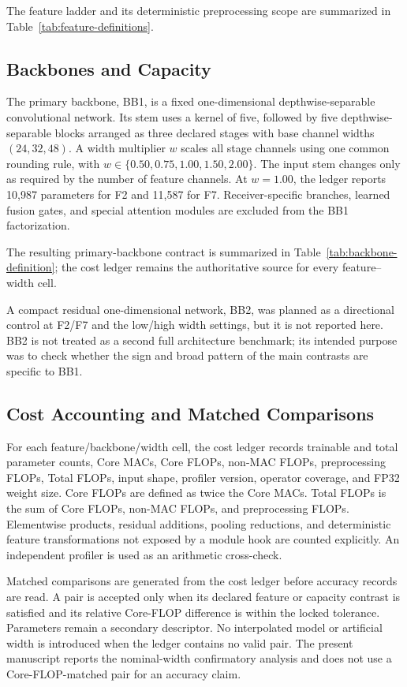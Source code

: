 The feature ladder and its deterministic preprocessing scope are summarized in
Table~\ref{tab:feature-definitions}.


\subsection{Backbones and Capacity}
The primary backbone, BB1, is a fixed one-dimensional depthwise-separable
convolutional network. Its stem uses a kernel of five, followed by five
depthwise-separable blocks arranged as three declared stages with base channel
widths $(24,32,48)$. A width multiplier $w$ scales all stage channels using one
common rounding rule, with $w\in\{0.50,0.75,1.00,1.50,2.00\}$. The input stem
changes only as required by the number of feature channels. At $w=1.00$, the
ledger reports 10,987 parameters for F2 and 11,587 for F7. Receiver-specific
branches, learned fusion gates, and special attention modules are excluded
from the BB1 factorization.

The resulting primary-backbone contract is summarized in
Table~\ref{tab:backbone-definition}; the cost ledger remains the authoritative
source for every feature--width cell.


A compact residual one-dimensional network, BB2, was planned as a directional
control at F2/F7 and the low/high width settings, but it is not reported here.
BB2 is not treated as a second full architecture benchmark; its intended
purpose was to check whether the sign and broad pattern of the main contrasts
are specific to BB1.

\subsection{Cost Accounting and Matched Comparisons}
For each feature/backbone/width cell, the cost ledger records trainable and
total parameter counts, Core MACs, Core FLOPs, non-MAC FLOPs,
preprocessing FLOPs, Total FLOPs, input shape, profiler version, operator
coverage, and FP32 weight size. Core FLOPs are defined as twice the Core MACs.
Total FLOPs is the sum of Core FLOPs, non-MAC FLOPs, and preprocessing FLOPs.
Elementwise products, residual additions, pooling reductions, and deterministic
feature transformations not exposed by a module hook are counted explicitly.
An independent profiler is used as an arithmetic cross-check.

Matched comparisons are generated from the cost ledger before accuracy records
are read. A pair is accepted only when its declared feature or capacity
contrast is satisfied and its relative Core-FLOP difference is within the
locked tolerance. Parameters remain a secondary descriptor. No interpolated
model or artificial width is introduced when the ledger contains no valid pair.
The present manuscript reports the nominal-width confirmatory analysis and does
not use a Core-FLOP-matched pair for an accuracy claim.

